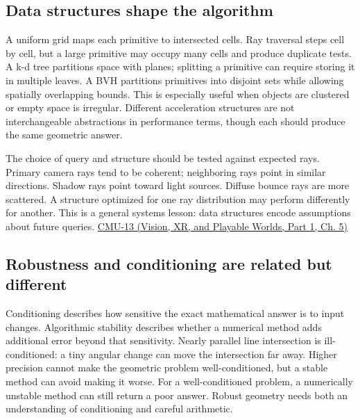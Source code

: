 \subsection{Data structures shape the algorithm}\label{04-visual-computing-ii-ch029-data-structures-shape-the-algorithm}

\hypertarget{04-visual-computing-ii-ch029-data-structures-shape-the-algorithm}{}

A uniform grid maps each primitive to intersected cells. Ray traversal steps cell by cell, but a large primitive may occupy many cells and produce duplicate tests. A k-d tree partitions space with planes; splitting a primitive can require storing it in multiple leaves. A BVH partitions primitives into disjoint sets while allowing spatially overlapping bounds. This is especially useful when objects are clustered or empty space is irregular. Different acceleration structures are not interchangeable abstractions in performance terms, though each should produce the same geometric answer.

The choice of query and structure should be tested against expected rays. Primary camera rays tend to be coherent; neighboring rays point in similar directions. Shadow rays point toward light sources. Diffuse bounce rays are more scattered. A structure optimized for one ray distribution may perform differently for another. This is a general systems lesson: data structures encode assumptions about future queries. \href{../07-Vision-XR-and-Playable-Worlds-P01/main.pdf\#nameddest=04-visual-computing-ii-ch036-cmu-13---spatial-data-structures}{CMU-13 (Vision, XR, and Playable Worlds, Part 1, Ch. 5)}

\subsection{Robustness and conditioning are related but different}\label{04-visual-computing-ii-ch029-robustness-and-conditioning-are-related-but-different}

\hypertarget{04-visual-computing-ii-ch029-robustness-and-conditioning-are-related-but-different}{}

Conditioning describes how sensitive the exact mathematical answer is to input changes. Algorithmic stability describes whether a numerical method adds additional error beyond that sensitivity. Nearly parallel line intersection is ill-conditioned: a tiny angular change can move the intersection far away. Higher precision cannot make the geometric problem well-conditioned, but a stable method can avoid making it worse. For a well-conditioned problem, a numerically unstable method can still return a poor answer. Robust geometry needs both an understanding of conditioning and careful arithmetic.

